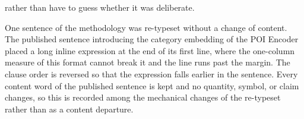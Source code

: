rather than have to guess whether it was deliberate.

One sentence of the methodology was re-typeset without a change of content. The
published sentence introducing the category embedding of the POI Encoder placed a long
inline expression at the end of its first line, where the one-column measure of this
format cannot break it and the line runs past the margin. The clause order is reversed
so that the expression falls earlier in the sentence. Every content word of the
published sentence is kept and no quantity, symbol, or claim changes, so this is
recorded among the mechanical changes of the re-typeset rather than as a content
departure.

